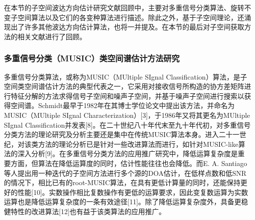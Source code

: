 在本节的子空间波达方向估计研究文献回顾中，主要对多重信号分类算法、旋转不变子空间算法以及它们的各变种算法进行描述。除此之外，基于子空间理论，还涌现出了许多其他波达方向估计算法，也将一并提及。在本节的最后对子空间获取方法的相关文献进行了回顾。

\subsubsection{多重信号分类（MUSIC）类空间谱估计方法研究}
多重信号分类算法，或称为MUSIC（MUltiple SIgnal Classification）算法，是子空间类空间谱估计方法的典型代表之一，它采用对接收信号所构造的协方差矩阵进行特征分解的方法求得信号子空间和噪声子空间，并基于噪声子空间进行搜索以获得空间谱。Schmidt最早于1982年在其博士学位论文中提出该方法，并命名为MUSIC（MUltiple SIgnal Characterization）[3]，于1986年又将其更名为MUltiple SIgnal Classification并发表[8]。在二十世纪八十年代末至九十年代初，对多重信号分类方法的理论研究及分析主要还是集中在传统MUSIC算法本身。进入二十一世纪，对该类方法的理论分析已是针对一些改进算法而进行，如针对MUSIC-like算法的深入分析[9]。在多重信号分类方法的应用推广研究中，降低运算复杂度是重要方面，但算法在降低运算度的同时，估计性能往往也会降低。而E. A. Santiago 等人提出用一种迭代的子空间方法进行多个源的DOA估计，在低样点数和低SNR的情况下，相比已有的root-MUSIC算法，在具有更低计算量的同时，还能保持更好的性能[10]。实数操作相比复数操作有更低的运算要求，因此变复数运算为实数运算也是降低运算复杂度的一条有效途径[11]。除了降低运算复杂度外，具备更稳健特性的改进算法[12]也有益于该类算法的应用推广。
